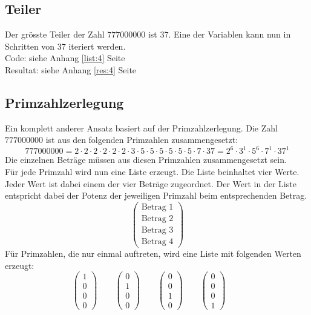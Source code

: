 \documentclass[a4paper, 10pt, fleqn]{article}
\begin{document}
\subsection{Teiler}
\label{sec:4}
Der grösste Teiler der Zahl $777000000$ ist $37$. Eine der Variablen kann nun 
in Schritten von 37 iteriert werden. \\
Code: siehe Anhang \ref{list:4} Seite \pageref{list:4} \\
Resultat: siehe Anhang \ref{res:4} Seite \pageref{res:4} 
% 

\subsection{Primzahlzerlegung}
\label{sec:5}
Ein komplett anderer Ansatz basiert auf der Primzahlzerlegung. Die Zahl 
$777000000$ ist aus den folgenden Primzahlen zusammengesetzt: 
\[ 777000000 = 2 \cdot 2 \cdot 2 \cdot 2 \cdot 2 \cdot 2 \cdot 3 
\cdot 5 \cdot 5 \cdot 5 \cdot 5 \cdot 5 \cdot 5 \cdot 7 \cdot 37 
= 2^6 \cdot 3^1 \cdot 5^6 \cdot 7^1 \cdot 37^1 \]
Die einzelnen Beträge müssen aus diesen Primzahlen zusammengesetzt sein. \\
Für jede Primzahl wird nun eine Liste erzeugt. Die Liste beinhaltet vier Werte. 
Jeder Wert ist dabei einem der vier Beträge zugeordnet. Der Wert in der Liste 
entspricht dabei der Potenz der jeweiligen Primzahl beim entsprechenden Betrag. 
\[ \begin{pmatrix}\text{Betrag 1}\\\text{Betrag 2}
\\\text{Betrag 3}\\\text{Betrag 4}\end{pmatrix} \]
Für Primzahlen, die nur einmal auftreten, wird eine Liste mit folgenden Werten 
erzeugt: 
\[ \begin{pmatrix}1\\0\\0\\0\end{pmatrix} \qquad 
   \begin{pmatrix}0\\1\\0\\0\end{pmatrix} \qquad 
   \begin{pmatrix}0\\0\\1\\0\end{pmatrix} \qquad 
   \begin{pmatrix}0\\0\\0\\1\end{pmatrix} \qquad \]
\end{document}
